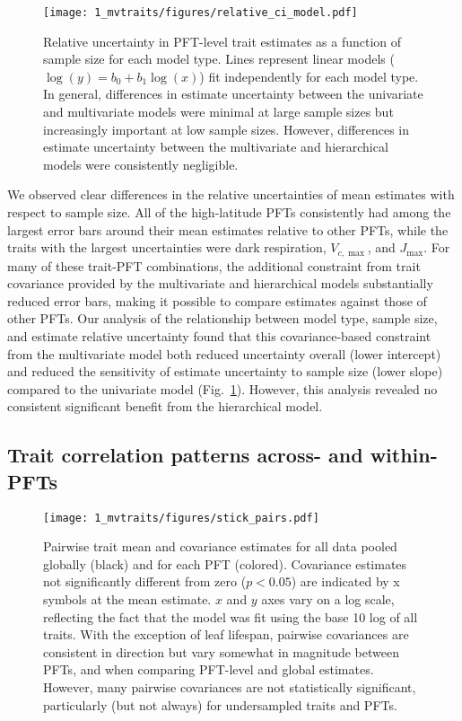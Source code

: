 \begin{figure}
  \centering
  \texttt{[image: 1\_mvtraits/figures/relative\_ci\_model.pdf]}
  \caption{%
    Relative uncertainty in PFT-level trait estimates as a function of sample size for each model type.
    Lines represent linear models ($\log(y) = b_0 + b_1 \log(x)$) fit independently for each model type.
    In general, differences in estimate uncertainty between the univariate and multivariate models were minimal at large sample sizes but increasingly important at low sample sizes.
    However, differences in estimate uncertainty between the multivariate and hierarchical models were consistently negligible.
  }\label{fig:mvtraits-fig3}
\end{figure}

We observed clear differences in the relative uncertainties of mean estimates with respect to sample size.
All of the high-latitude PFTs consistently had among the largest error bars around their mean estimates relative to other PFTs, while the traits with the largest uncertainties were dark respiration, $V_{c,\max}$, and $J_{\max}$.
For many of these trait-PFT combinations, the additional constraint from trait covariance provided by the multivariate and hierarchical models substantially reduced error bars, making it possible to compare estimates against those of other PFTs.
Our analysis of the relationship between model type, sample size, and estimate relative uncertainty found that this covariance-based constraint from the multivariate model both reduced uncertainty overall (lower intercept) and reduced the sensitivity of estimate uncertainty to sample size (lower slope) compared to the univariate model (Fig.~\ref{fig:mvtraits-fig3}).
However, this analysis revealed no consistent significant benefit from the hierarchical model.


\subsection{Trait correlation patterns across- and within-PFTs}

\begin{figure}
  \centering
  \texttt{[image: 1\_mvtraits/figures/stick\_pairs.pdf]}
  \caption{%
    Pairwise trait mean and covariance estimates for all data pooled globally (black) and for each PFT (colored).
    Covariance estimates not significantly different from zero ($p < 0.05$) are indicated by x symbols at the mean estimate.
    $x$ and $y$ axes vary on a log scale, reflecting the fact that the model was fit using the base 10 log of all traits.
    With the exception of leaf lifespan, pairwise covariances are consistent in direction but vary somewhat in magnitude between PFTs, and when comparing PFT-level and global estimates.
    However, many pairwise covariances are not statistically significant, particularly (but not always) for undersampled traits and PFTs.
  }\label{fig:mvtraits-fig4}
\end{figure}

